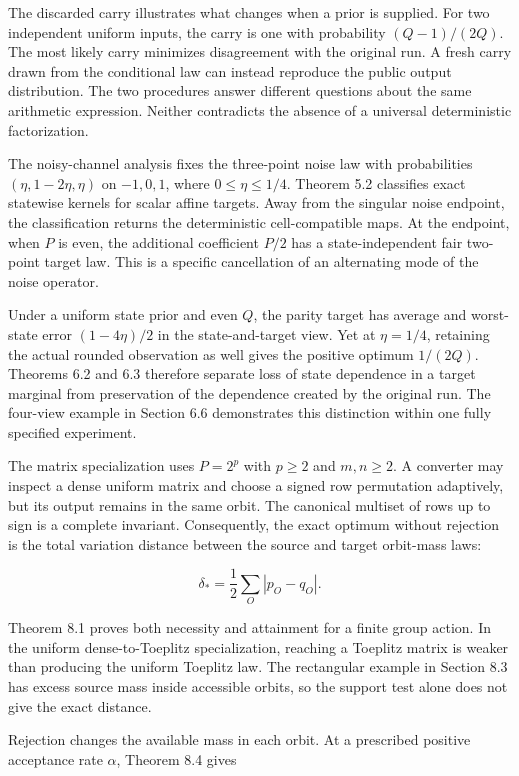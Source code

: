 \documentclass[
]{article}
\begin{document}
The discarded carry illustrates what changes when a prior is supplied.
For two independent uniform inputs, the carry is one with probability
\((Q-1)/(2Q)\). The most likely carry minimizes disagreement with the
original run. A fresh carry drawn from the conditional law can instead
reproduce the public output distribution. The two procedures answer
different questions about the same arithmetic expression. Neither
contradicts the absence of a universal deterministic factorization.

The noisy-channel analysis fixes the three-point noise law with
probabilities \((\eta,1-2\eta,\eta)\) on \(-1,0,1\), where
\(0\le\eta\le1/4\). Theorem 5.2 classifies exact statewise kernels for
scalar affine targets. Away from the singular noise endpoint, the
classification returns the deterministic cell-compatible maps. At the
endpoint, when \(P\) is even, the additional coefficient \(P/2\) has a
state-independent fair two-point target law. This is a specific
cancellation of an alternating mode of the noise operator.

Under a uniform state prior and even \(Q\), the parity target has
average and worst-state error \((1-4\eta)/2\) in the state-and-target
view. Yet at \(\eta=1/4\), retaining the actual rounded observation as
well gives the positive optimum \(1/(2Q)\). Theorems 6.2 and 6.3
therefore separate loss of state dependence in a target marginal from
preservation of the dependence created by the original run. The
four-view example in Section 6.6 demonstrates this distinction within
one fully specified experiment.

The matrix specialization uses \(P=2^p\) with \(p\ge2\) and \(m,n\ge2\).
A converter may inspect a dense uniform matrix and choose a signed row
permutation adaptively, but its output remains in the same orbit. The
canonical multiset of rows up to sign is a complete invariant.
Consequently, the exact optimum without rejection is the total variation
distance between the source and target orbit-mass laws:

\[
\delta_* = \frac12\sum_O |p_O-q_O|.
\]

Theorem 8.1 proves both necessity and attainment for a finite group
action. In the uniform dense-to-Toeplitz specialization, reaching a
Toeplitz matrix is weaker than producing the uniform Toeplitz law. The
rectangular example in Section 8.3 has excess source mass inside
accessible orbits, so the support test alone does not give the exact
distance.

Rejection changes the available mass in each orbit. At a prescribed
positive acceptance rate \(\alpha\), Theorem 8.4 gives
\end{document}
